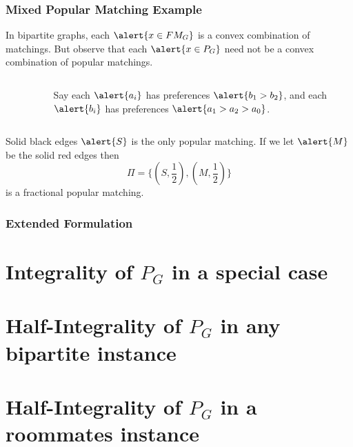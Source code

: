 \documentclass[10pt]{beamer}
\begin{document}
\begin{frame}
\frametitle{Mixed Popular Matching Example}
In bipartite graphs, each $\alert{x \in FM_G}$ is a convex combination of matchings. But observe that each $\alert{x\in P_G}$ need not be a convex combination of popular matchings.
\begin{columns}[T] %
\begin{column}{.48\textwidth}
\begin{figure}
\end{figure}
\end{column}%
\hfill%
\begin{column}{.48\textwidth}
$$ $$
Say each $\alert{a_i}$ has preferences $\alert{b_1 > b_2}$, and each $\alert{b_i}$ has preferences $\alert{a_1 > a_2 > a_0}$.
\end{column}%
\end{columns}
Solid black edges $\alert{S}$ is the only popular matching. If we let $\alert{M}$ be the solid red edges then $$\Pi= \{(S,\frac{1}{2}), (M,\frac{1}{2})\}$$ is a fractional popular matching.
\end{frame}

\begin{frame}
\frametitle{Extended Formulation}

\end{frame}
\section{Integrality of $P_G$ in a special case}

\section{Half-Integrality of $P_G$ in any bipartite instance}
\section{Half-Integrality of $P_G$ in a roommates instance}
\end{document}

